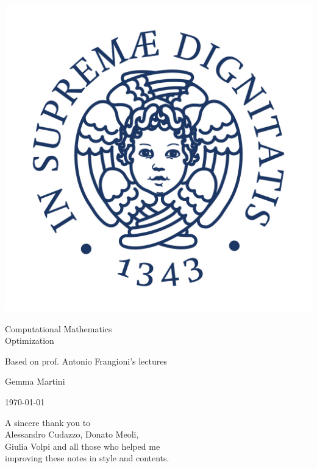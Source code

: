 \documentclass[ComputationalMathematics.tex]{subfiles}
\begin{document}
\begin{titlepage}
    \begin{center}
    \vspace{3cm}
    
    \Large
    
    \vspace{2cm}
    
    \includegraphics[scale=0.3]{pics/cherubino.jpg}
    
    \vspace{2.5cm}
    
    {\Huge \sc Computational Mathematics\\ Optimization}
    
    \vspace{2cm}
    Based on prof. Antonio Frangioni's lectures
    
    \vspace{2cm}
    Gemma Martini
    \vfill
    
    \today
    
    \end{center}
\end{titlepage}


\phantom{pippo}
\vspace{5cm}
\begin{flushleft}
A sincere thank you to\\
Alessandro Cudazzo, Donato Meoli,\\
Giulia Volpi and all those who helped me\\
improving these notes in style and contents.\\
\end{flushleft}
\newpage
\end{document}
